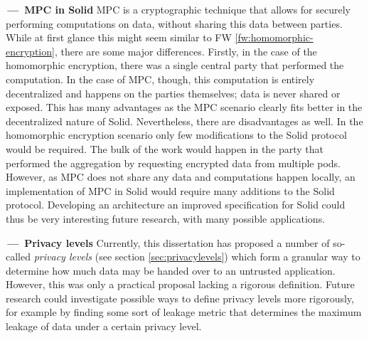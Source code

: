 \begin{futurework}\label{fw:mpc}
\textbf{\,---\, \gls{MPC} in Solid} \acrlong{MPC} is a cryptographic technique that allows for securely performing computations on data, without sharing this data between parties. While at first glance this might seem similar to FW \ref{fw:homomorphic-encryption}, there are some major differences. Firstly, in the case of the homomorphic encryption, there was a single central party that performed the computation. In the case of \gls{MPC}, though, this computation is entirely decentralized and happens on the parties themselves; data is never shared or exposed. 
This has many advantages as the \gls{MPC} scenario clearly fits better in the decentralized nature of Solid. Nevertheless, there are disadvantages as well. In the homomorphic encryption scenario only few modifications to the Solid protocol would be required. The bulk of the work would happen in the party that performed the aggregation by requesting encrypted data from multiple pods. However, as \gls{MPC} does not share any data and computations happen locally, an implementation of \gls{MPC} in Solid would require many additions to the Solid protocol. Developing an architecture an improved specification for Solid could thus be very interesting future research, with many possible applications.
\end{futurework}

\newpage
\begin{futurework}\label{fw:privacy-levels}
\textbf{\,---\, Privacy levels} Currently, this dissertation has proposed a number of so-called \textit{privacy levels} (see section \ref{sec:privacylevels}) which form a granular way to determine how much data may be handed over to an untrusted application. However, this was only a practical proposal lacking a rigorous definition. Future research could investigate possible ways to define privacy levels more rigorously, for example by finding some sort of leakage metric that determines the maximum leakage of data under a certain privacy level.
\end{futurework}

